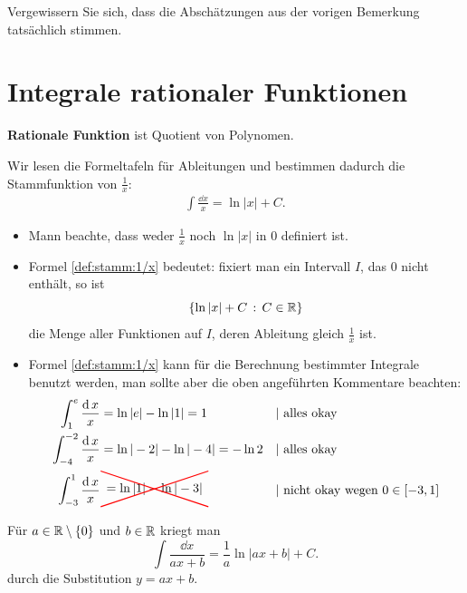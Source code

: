 \begin{aufg}
	Vergewissern Sie sich, dass die Abschätzungen aus der vorigen Bemerkung tatsächlich stimmen. 
\end{aufg} 

\section{Integrale rationaler Funktionen}

\begin{defn}
	\textbf{Rationale Funktion} ist Quotient von Polynomen. 
\end{defn} 

\begin{bsp}
	Wir lesen die Formeltafeln für Ableitungen und bestimmen dadurch die Stammfunktion von $\frac{1}{x}$:
	\begin{align}
	\label{def:stamm:1/x}
	\int \frac{\dd x}{x} = \ln |x| + C. 
	\end{align}
	
	\begin{itemize}
		\item Mann beachte, dass weder $\frac{1}{x}$ noch $\ln |x|$ in $0$ definiert ist. 
		\item Formel \eqref{def:stamm:1/x} bedeutet: fixiert man ein Intervall $I$, das $0$ nicht enthält, so ist 
		\[
		\left\{ \ln |x| + C \,:\, C \in \mathbb{R} \right\}
		\] die Menge aller Funktionen auf $I$, deren Ableitung gleich $\frac{1}{x}$ ist. 
		\item Formel \eqref{def:stamm:1/x} kann für die Berechnung bestimmter Integrale benutzt werden, man sollte aber die oben angeführten Kommentare beachten:
		\begin{align*}
		\int_1^e \frac{\dd x}{x} & = \ln |e| - \ln |1| = 1  & & |\text{ alles okay}
		\\ \int_{-4}^{-2} \frac{\dd x}{x} & = \ln |-2| - \ln |-4| = - \ln 2  & & |\text{ alles okay}
		\\ \int_{-3}^1 \frac{\dd x}{x} &  \tikz[baseline=-4]{\node at (0,0) {\(= \ln |1| - \ln |-3| \)}; \draw[red, thick] (-1.5,-0.5) -- (1.5,0.5); \draw[red,thick] (-1.5,0.5) -- (1.5,-0.5); } & & |\text{ nicht okay wegen $0 \in [-3,1]$} 
		\end{align*}
	\end{itemize} 
\end{bsp} 

\begin{bsp}
	Für $a \in \mathbb{R} \setminus \{0\}$ und $b \in \mathbb{R}$ kriegt man 
	\[
	\int \frac{\dd x}{a x+ b} = \frac{1}{a} \ln |a x + b| + C.
	\]
	durch die Substitution $y = a x + b$. 
\end{bsp} 

